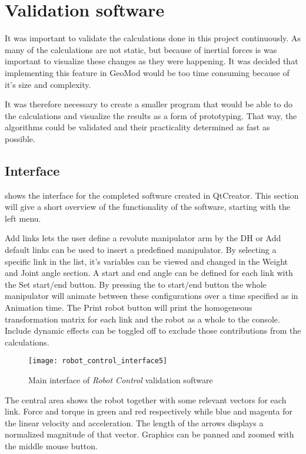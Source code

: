 \chapter{Validation software}

It was important to validate the calculations done in this project continuously. As many of the calculations are not static, but because of inertial forces is was important to visualize these changes as they were happening. It was decided that implementing this feature in GeoMod would be too time consuming because of it's size and complexity. 

It was therefore necessary to create a smaller program that would be able to do the calculations and visualize the results as a form of prototyping. That way, the algorithms could be validated and their practicality determined as fast as possible.


\section{Interface}\label{interfaceSec}

 shows the interface for the completed software created in QtCreator. This section will give a short overview of the functionality of the software, starting with the left menu.

\textsf{Add links} lets the user define a revolute manipulator arm by the \gls{DH} or \textsf{Add default links} can be used to insert a predefined manipulator. By selecting a specific link in the list, it's variables can be viewed and changed in the \textsf{Weight} and \textsf{Joint angle} section. A start and end angle can be defined for each link with the \textsf{Set start/end} button. By pressing the \textsf{to start/end} button the whole manipulator will animate between these configurations over a time specified as in \textsf{Animation time}. The \textsf{Print robot} button will print the homogeneous transformation matrix for each link and the robot as a whole to the console. \textsf{Include dynamic effects} can be toggled off to exclude those contributions from the calculations.

\begin{figure}[h!]
    \centering
    \texttt{[image: robot\_control\_interface5]}
    \caption{Main interface of \textit{Robot Control} validation software}
    \label{interface}
\end{figure}

The central area shows the robot together with some relevant vectors for each link. Force and torque in green and red respectively while blue and magenta for the linear velocity and acceleration. The length of the arrows displays a normalized magnitude of that vector. Graphics can be panned and zoomed with the middle mouse button.

